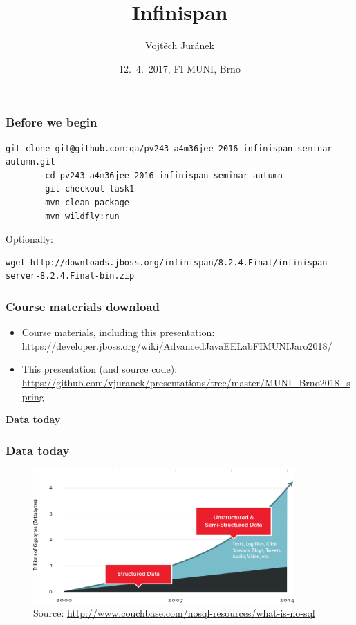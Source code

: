 \documentclass[10pt,utf8]{beamer}
\title{Infinispan}
\author{Vojtěch Juránek}
\institute[Red Hat]{JBoss - a division by Red Hat}
\date{12.~4.~2017, FI MUNI, Brno}
\begin{document}


\begin{frame}[fragile]
	\frametitle{Before we begin}
	\begin{lstlisting}[style=Bash]
		git clone git@github.com:qa/pv243-a4m36jee-2016-infinispan-seminar-autumn.git
		cd pv243-a4m36jee-2016-infinispan-seminar-autumn
		git checkout task1
		mvn clean package
		mvn wildfly:run
	\end{lstlisting}
	\vspace{0.5cm}
	Optionally:
	\begin{lstlisting}[style=Bash]
		wget http://downloads.jboss.org/infinispan/8.2.4.Final/infinispan-server-8.2.4.Final-bin.zip
	\end{lstlisting}
\end{frame}

\begin{frame}
 \titlepage
\end{frame}

\begin{frame}
	\frametitle{Course materials download}
	\scriptsize{
	\begin{itemize}
		\item Course materials, including this presentation:\\
		\color{blue}\url{https://developer.jboss.org/wiki/AdvancedJavaEELabFIMUNIJaro2018/}\color{black}
		\item This presentation (and source code):\\ 
		\color{blue}\url{https://github.com/vjuranek/presentations/tree/master/MUNI_Brno2018_spring}\color{black}
	\end{itemize}
	}
\end{frame}

\begin{frame}
	\centering
	\huge{\textbf{Data today}}
\end{frame}


\begin{frame}
	\frametitle{Data today}
	\begin{figure}
		\centering
		\includegraphics[width=10cm]{./img/why-nosql-2.eps}
		\caption{\tiny{Source: \url{http://www.couchbase.com/nosql-resources/what-is-no-sql}}}
	\end{figure}
\end{frame}
\end{document}

